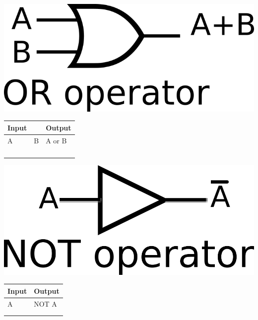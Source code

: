 \documentclass[11pt]{report}
\begin{document}
\vspace{20mm}
\hspace{1in}
\begin{minipage}{.5\linewidth}
    \includegraphics[width=3 in]{images/or1.png}
	\label{img2}
\end{minipage}
\begin{minipage}{\linewidth}
\begin{tabular}{|ll|l|}
	\hline
	Input                   &   & Output \\ \hline
	\multicolumn{1}{|l|}{A} & B & A or B \\ \hline
	\multicolumn{1}{|l|}{}  &   &        \\ \hline
	\multicolumn{1}{|l|}{}  &   &        \\ \hline
	\multicolumn{1}{|l|}{}  &   &        \\ \hline
	\multicolumn{1}{|l|}{}  &   &        \\ \hline
\end{tabular}

\end{minipage}


\vspace{20mm}
\hspace{1in}
\begin{minipage}{.5\linewidth}
    \includegraphics[width=3 in]{images/not1.png}
	\label{img2}
\end{minipage}
\begin{minipage}{\linewidth}
	\begin{tabular}{|l|l|}
		\hline
		Input & Output \\ \hline
		A     & NOT A  \\ \hline
		&        \\ \hline
		&        \\ \hline
	\end{tabular}
\end{minipage}
\end{document}
